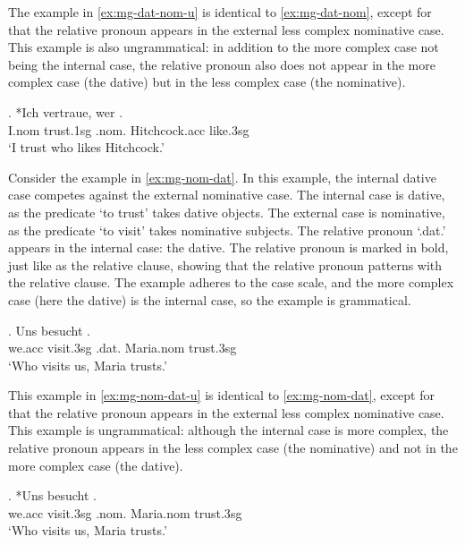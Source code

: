 The example in \ref{ex:mg-dat-nom-u} is identical to \ref{ex:mg-dat-nom}, except for that the relative pronoun appears in the external less complex nominative case. This example is also ungrammatical: in addition to the more complex case not being the internal case, the relative pronoun also does not appear in the more complex case (the dative) but in the less complex case (the nominative).

\exg. *Ich vertraue, wer  .\\
I.\ac{nom} trust.1\ac{sg}\scsub{[dat]} .\ac{nom}. Hitchcock.\ac{acc} like.3\ac{sg}\scsub{[nom]}\\
`I trust who likes Hitchcock.' \label{ex:mg-dat-nom-u}

Consider the example in \ref{ex:mg-nom-dat}. In this example, the internal dative case competes against the external nominative case.
The internal case is dative, as the predicate  `to trust' takes dative objects.
The external case is nominative, as the predicate  `to visit' takes nominative subjects.
The relative pronoun  `.\ac{dat}.' appears in the internal case: the dative. The relative pronoun is marked in bold, just like as the relative clause, showing that the relative pronoun patterns with the relative clause.
The example adheres to the case scale, and the more complex case (here the dative) is the internal case, so the example is grammatical.

\exg. Uns besucht   .\\
we.\ac{acc} visit.3\ac{sg}\scsub{[nom]} .\ac{dat}. Maria.\ac{nom} trust.3\ac{sg}\scsub{[dat]}\\
`Who visits us, Maria trusts.' \label{ex:mg-nom-dat}

This example in \ref{ex:mg-nom-dat-u} is identical to \ref{ex:mg-nom-dat}, except for that the relative pronoun appears in the external less complex nominative case. This example is ungrammatical: although the internal case is more complex, the relative pronoun appears in the less complex case (the nominative) and not in the more complex case (the dative).

\exg. *Uns besucht   .\\
we.\ac{acc} visit.3\ac{sg}\scsub{[nom]} .\ac{nom}. Maria.\ac{nom} trust.3\ac{sg}\scsub{[dat]}\\
`Who visits us, Maria trusts.' \label{ex:mg-nom-dat-u}

